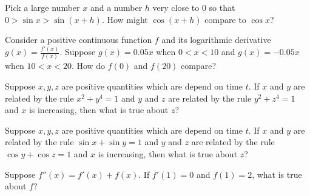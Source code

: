 \documentclass{ximera}
\newcommand{\recommendation}[1]{}
\begin{document}
\begin{shuffle}
\begin{problem}
  Pick a large number $x$ and a number $h$ very close to $0$ so that $0 > \sin x > \sin (x+h)$.  How might $\cos (x+h)$ compare to $\cos x$?
  \begin{multipleChoice}
  \end{multipleChoice}
\end{problem}

\begin{problem}
  Consider a positive continuous function $f$ and its logarithmic
  derivative $g(x) = \frac{f'(x)}{f(x)}$.  Suppose $g(x) = 0.05x$ when
  $0 < x < 10$ and $g(x) = -0.05x$ when $10 < x < 20$.  How do $f(0)$
  and $f(20)$ compare?
  \begin{multipleChoice}
  \end{multipleChoice}
\end{problem}

\begin{problem}
  Suppose $x, y, z$ are positive quantities which are depend on time
  $t$.  If $x$ and $y$ are related by the rule $x^2 + y^4 = 1$ and $y$
  and $z$ are related by the rule $y^2 + z^4 = 1$ and $x$ is
  increasing, then what is true about $z$?
  \begin{multipleChoice}
  \end{multipleChoice}
\end{problem}

\begin{problem}
  Suppose $x, y, z$ are positive quantities which are depend on time
  $t$.  If $x$ and $y$ are related by the rule $\sin x + \sin y = 1$ and $y$
  and $z$ are related by the rule $\cos y + \cos z = 1$ and $x$ is
  increasing, then what is true about $z$?
  \begin{multipleChoice}
  \end{multipleChoice}
\end{problem}

\begin{problem}
  Suppose $f''(x) = f'(x) + f(x)$.  If $f'(1) = 0$ and $f(1) = 2$, what is true about $f$?
  \begin{multipleChoice}
  \end{multipleChoice}
\end{problem}


\end{shuffle}
\end{document}
